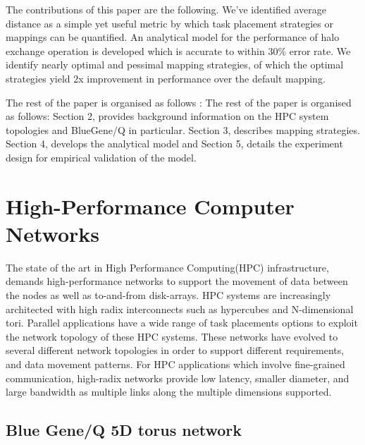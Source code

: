 \documentclass{acm_proc_article-sp}
\begin{document}
The contributions of this paper are the following. We've identified average distance as
a simple yet useful metric by which task placement strategies or mappings can be quantified.
An analytical model for the performance of halo exchange operation is developed which is accurate
to within 30\% error rate. We identify nearly optimal and pessimal mapping strategies, of which
the optimal strategies yield 2x improvement in performance over the default mapping.

The rest of the paper is organised as follows :
The rest of the paper is organised as follows: Section 2, provides background information on
the HPC system topologies and BlueGene/Q in particular. Section 3, describes mapping strategies.
Section 4, develops the analytical model and Section 5, details the experiment design for empirical
validation of the model.


\section{High-Performance Computer Networks}

The state of the art in High Performance Computing(HPC) infrastructure, demands high-performance networks
to support the movement of data between the nodes as well as to-and-from disk-arrays. HPC systems are
increasingly architected with high radix interconnects such as hypercubes and N-dimensional tori.
Parallel applications have a wide range of task placements options to exploit the network topology of
these HPC systems. These networks have evolved to several different network topologies in order to support
different requirements, and data movement patterns. For HPC applications which involve fine-grained communication,
high-radix networks provide low latency, smaller diameter, and large bandwidth as multiple links along the multiple
dimensions supported.

\subsection{Blue Gene/Q 5D torus network}
\end{document}
